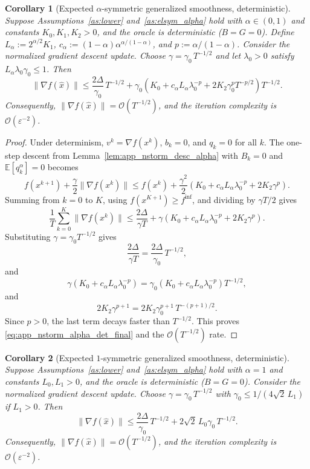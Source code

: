 \documentclass[letter,11pt]{article}
\newtheorem{corollary}{Corollary}[theorem]
\newcommand{\E}{\mathbb{E}}
\newcommand{\Ocal}{\mathcal{O}}
\begin{document}
\begin{corollary}[Expected $\alpha$-symmetric generalized smoothness, deterministic]
\label{cor:app_nstorm_alpha_det}
Suppose Assumptions~\ref{as:lower} and~\ref{as:elsym_alpha} hold with
$\alpha\in(0,1)$ and constants $K_0, K_1, K_2>0$, and the oracle is
deterministic ($B=G=0$). Define $L_\alpha:=2^{\alpha/2}K_1$,
$c_\alpha:=(1-\alpha)\alpha^{\alpha/(1-\alpha)}$, and $p:=\alpha/(1-\alpha)$.
Consider the normalized gradient descent update. Choose
$\gamma = \gamma_0\,T^{-1/2}$ and let $\lambda_0>0$ satisfy
$L_\alpha\lambda_0\gamma_0\le1$. Then
\begin{equation}
\label{eq:app_nstorm_alpha_det_final}
    \|\nabla f(\widehat x)\|
    \le
    \frac{2\Delta}{\gamma_0}\,T^{-1/2}
    + \gamma_0
    \left(
        K_0 + c_\alpha L_\alpha\lambda_0^{-p} + 2K_2\gamma_0^p T^{-p/2}
    \right) T^{-1/2}.
\end{equation}
Consequently,
$\|\nabla f(\widehat x)\| = \Ocal(T^{-1/2})$,
and the iteration complexity is $\Ocal(\varepsilon^{-2})$.
\end{corollary}

\begin{proof}
Under determinism, $v^k=\nabla f(x^k)$, $b_k=0$, and $q_k=0$ for all $k$.
The one-step descent from Lemma~\ref{lem:app_nstorm_desc_alpha} with $B_k=0$
and $\E[q_k^\alpha]=0$ becomes
\[
    f(x^{k+1})
    + \frac{\gamma}{2}\|\nabla f(x^k)\|
    \le f(x^k)
    + \frac{\gamma^2}{2}
    \left(
        K_0 + c_\alpha L_\alpha\lambda_0^{-p} + 2K_2\gamma^p
    \right).
\]
Summing from $k=0$ to $K$, using $f(x^{K+1})\ge f^{\inf}$, and dividing by
$\gamma T/2$ gives
\[
    \frac{1}{T}\sum_{k=0}^{K}\|\nabla f(x^k)\|
    \le
    \frac{2\Delta}{\gamma T}
    + \gamma
    \left(
        K_0 + c_\alpha L_\alpha\lambda_0^{-p} + 2K_2\gamma^p
    \right).
\]
Substituting $\gamma=\gamma_0 T^{-1/2}$ gives
\[
    \frac{2\Delta}{\gamma T}
    = \frac{2\Delta}{\gamma_0}\,T^{-1/2},
\]
and
\[
    \gamma\left(K_0 + c_\alpha L_\alpha\lambda_0^{-p}\right)
    = \gamma_0\left(K_0 + c_\alpha L_\alpha\lambda_0^{-p}\right) T^{-1/2},
\]
and
\[
    2K_2\gamma^{p+1}
    = 2K_2\gamma_0^{p+1}\,T^{-(p+1)/2}.
\]
Since $p>0$, the last term decays faster than $T^{-1/2}$. This proves
\eqref{eq:app_nstorm_alpha_det_final} and the $\Ocal(T^{-1/2})$ rate.
\end{proof}

\begin{corollary}[Expected $1$-symmetric generalized smoothness, deterministic]
\label{cor:app_nstorm_one_det}
Suppose Assumptions~\ref{as:lower} and~\ref{as:elsym_alpha} hold with
$\alpha=1$ and constants $L_0,L_1>0$, and the oracle is deterministic
($B=G=0$). Consider the normalized gradient descent update. Choose
$\gamma = \gamma_0\,T^{-1/2}$ with $\gamma_0\le 1/(4\sqrt{2}\,L_1)$ if
$L_1>0$. Then
\begin{equation}
\label{eq:app_nstorm_one_det_final}
    \|\nabla f(\widehat x)\|
    \le
    \frac{2\Delta}{\gamma_0}\,T^{-1/2}
    + 2\sqrt{2}\,L_0\gamma_0\,T^{-1/2}.
\end{equation}
Consequently,
$\|\nabla f(\widehat x)\| = \Ocal(T^{-1/2})$,
and the iteration complexity is $\Ocal(\varepsilon^{-2})$.
\end{corollary}
\end{document}
